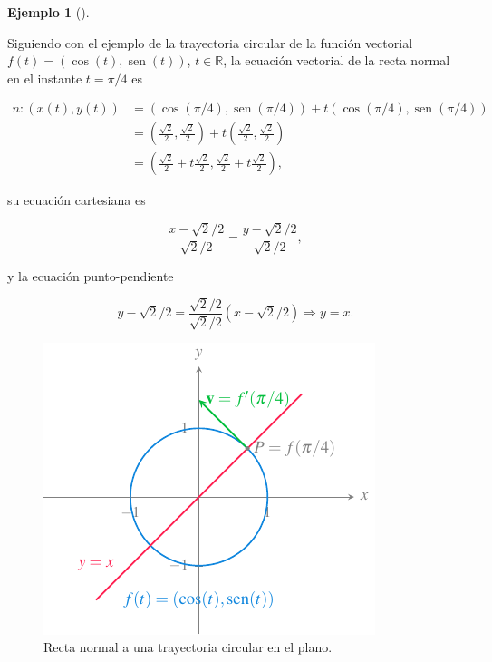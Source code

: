 \documentclass[
  a4paper,
]{scrreport}
\theoremstyle{definition}
\newtheorem{example}{Ejemplo}[chapter]
\theoremstyle{plain}
\theoremstyle{plain}
\theoremstyle{plain}
\theoremstyle{definition}
\theoremstyle{remark}
\begin{document}
\begin{example}[]\protect\hypertarget{exm-normal-tangente-plano}{}\label{exm-normal-tangente-plano}

Siguiendo con el ejemplo de la trayectoria circular de la función
vectorial \(f(t) = (\cos(t),\operatorname{sen}(t))\),
\(t\in \mathbb{R}\), la ecuación vectorial de la recta normal en el
instante \(t=\pi/4\) es

\begin{align*}
n: (x(t),y(t)) 
&= (\cos(\pi/4),\operatorname{sen}(\pi/4)) + t(\cos(\pi/4),\operatorname{sen}(\pi/4)) \\
&= \left(\frac{\sqrt{2}}{2},\frac{\sqrt{2}}{2}\right)+t\left(\frac{\sqrt{2}}{2},\frac{\sqrt{2}}{2}\right) \\
&=\left(\frac{\sqrt{2}}{2}+t\frac{\sqrt{2}}{2},\frac{\sqrt{2}}{2}+t\frac{\sqrt{2}}{2}\right),
\end{align*}

su ecuación cartesiana es

\[
\frac{x-\sqrt{2}/2}{\sqrt{2}/2} = \frac{y-\sqrt{2}/2}{\sqrt{2}/2},
\]

y la ecuación punto-pendiente

\[
y-\sqrt{2}/2 = \frac{\sqrt{2}/2}{\sqrt{2}/2}(x-\sqrt{2}/2) \Rightarrow y=x.
\]

\begin{figure}

{\centering \includegraphics{img/derivadas-funciones-vectoriales/normal-trayectoria-plano.pdf}

}

\caption{Recta normal a una trayectoria circular en el plano.}

\end{figure}

\end{example}
\end{document}
